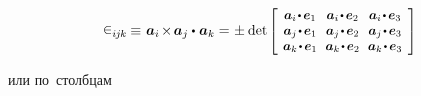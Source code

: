 \begin{otherlanguage}{russian}
\nopagebreak\vspace{-0.2em}\begin{equation*}
\levicivita_{i\hspace{-0.1ex}j\hspace{-0.1ex}k} \hspace{-0.1ex}
\equiv \hspace{.16ex} \bm{a}_i \hspace{-0.25ex} \times \hspace{-0.25ex} \bm{a}_j \dotp \hspace{0.1ex} \bm{a}_k =
\hspace{.1ex} \pm \hspace{.1ex} \operatorname{det}\hspace{-0.1ex}
\scalebox{0.92}[0.92]{$\left[\hspace{-0.2ex}\begin{array}{c@{\hspace{.64em}}c@{\hspace{.64em}}c}
\bm{a}_i \narrowdotp\hspace{.12ex} \bm{e}_1 & \bm{a}_i \narrowdotp\hspace{.12ex} \bm{e}_2 & \bm{a}_i \narrowdotp\hspace{.12ex} \bm{e}_3 \\
\bm{a}_j \narrowdotp\hspace{.12ex} \bm{e}_1 & \bm{a}_j \narrowdotp\hspace{.12ex} \bm{e}_2 & \bm{a}_j \narrowdotp\hspace{.12ex} \bm{e}_3 \\
\bm{a}_k \narrowdotp\hspace{.12ex} \bm{e}_1 & \bm{a}_k \narrowdotp\hspace{.12ex} \bm{e}_2 & \bm{a}_k \narrowdotp\hspace{.12ex} \bm{e}_3
\end{array}\hspace{-0.12ex}\right]$}
\end{equation*}

\vspace{-0.2em} \noindent или по~столбцам


\end{otherlanguage}
